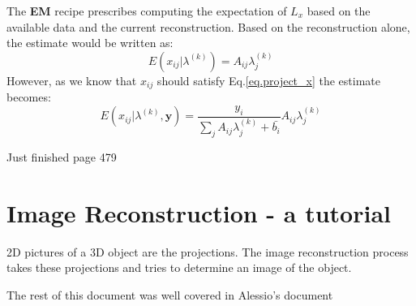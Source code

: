 \documentclass{article}
\begin{document}
The \textbf{EM} recipe prescribes computing the expectation of $L_x$ based on the available data and the current reconstruction. Based on the reconstruction alone, the estimate would be written as:
\begin{equation}
E(x_{ij}|\lambda^{(k)}) = A_{ij}\lambda_j^{(k)}
\end{equation}
However, as we know that $x_{ij}$ should satisfy Eq.\ref{eq.project_x}  the estimate becomes:
\begin{equation}
E(x_{ij}|\lambda^{(k)},\textbf{y}) =  \frac{y_i}{\sum_j A_{ij}\lambda_j^{(k)} + \bar{b_i}}    A_{ij}\lambda_j^{(k)}
\end{equation}



Just finished page 479






\newpage
\section{Image Reconstruction - a tutorial} \cite{Zeng2001}

2D pictures of a 3D object are the projections. The image reconstruction process takes these projections and tries to determine an image of the object.  

The rest of this document was well covered in Alessio's document \cite{Alessio2006} 








\newpage

 

\end{document}

